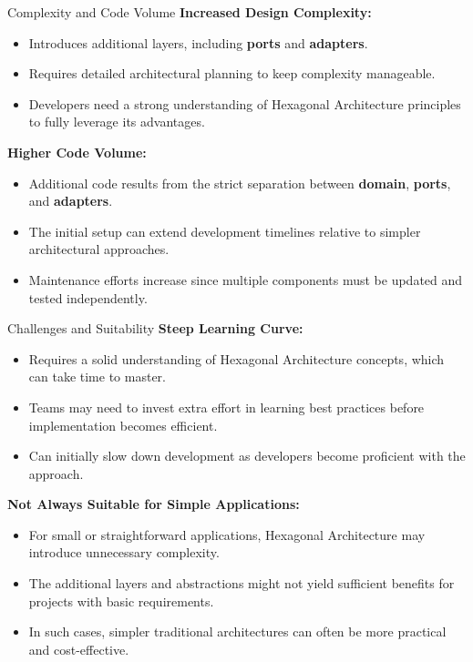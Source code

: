 \documentclass[aspectratio=169, table]{beamer}
\begin{document}
\begin{frame}[fragile]{Complexity and Code Volume}
	\vspace{20pt}
	\textbf{Increased Design Complexity:}
	\begin{itemize}
		\item Introduces additional layers, including \textbf{ports} and \textbf{adapters}.
		\item Requires detailed architectural planning to keep complexity manageable.
		\item Developers need a strong understanding of Hexagonal Architecture principles to fully leverage its advantages.
	\end{itemize}
	
	\textbf{Higher Code Volume:}
	\begin{itemize}
		\item Additional code results from the strict separation between \textbf{domain}, \textbf{ports}, and \textbf{adapters}.
		\item The initial setup can extend development timelines relative to simpler architectural approaches.
		\item Maintenance efforts increase since multiple components must be updated and tested independently.
	\end{itemize}
\end{frame}


\begin{frame}[fragile]{Challenges and Suitability}
	\vspace{20pt}
	\textbf{Steep Learning Curve:}
	\begin{itemize}
		\item Requires a solid understanding of Hexagonal Architecture concepts, which can take time to master.
		\item Teams may need to invest extra effort in learning best practices before implementation becomes efficient.
		\item Can initially slow down development as developers become proficient with the approach.
	\end{itemize}
	
	\textbf{Not Always Suitable for Simple Applications:}
	\begin{itemize}
		\item For small or straightforward applications, Hexagonal Architecture may introduce unnecessary complexity.
		\item The additional layers and abstractions might not yield sufficient benefits for projects with basic requirements.
		\item In such cases, simpler traditional architectures can often be more practical and cost-effective.
	\end{itemize}
\end{frame}
\end{document}
